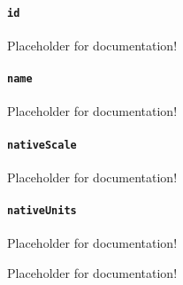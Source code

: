 \paragraph{\texttt{id}}\mbox{}
\newline\tab Placeholder for documentation!

\paragraph{\texttt{name}}\mbox{}
\newline\tab Placeholder for documentation!

\paragraph{\texttt{nativeScale}}\mbox{}
\newline\tab Placeholder for documentation!

\paragraph{\texttt{nativeUnits}}\mbox{}
\newline\tab Placeholder for documentation!

Placeholder for documentation!

